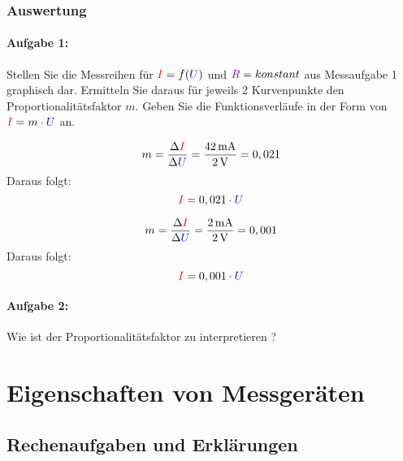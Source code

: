 \documentclass[11pt,a4paper,titlepage]{scrreprt}
\begin{document}
        \subsection{Auswertung}
          \subsubsection{Aufgabe 1:} Stellen Sie die Messreihen für $\textcolor{red}{I} = f(\textcolor{blue}{U})$ und $\textcolor{violet}{R} = konstant$  aus Messaufgabe 1 graphisch dar. Ermitteln Sie daraus für jeweils 2 Kurvenpunkte den Proportionalitätsfaktor $m$. Geben Sie die Funktionsverläufe in der Form von $\textcolor{red}{I} = m \cdot \textcolor{blue}{U}$ an.
            
            \begin{equation*}
            	m = \frac{\Delta \textcolor{red}{I}}{\Delta \textcolor{blue}{U}} = \frac{\SI{42}{\milli\ampere}}{\SI{2}{\volt}} = 0,021
            \end{equation*}
            Daraus folgt:
            \begin{equation*}
            	\textcolor{red}{I} = 0,021 \cdot \textcolor{blue}{U}
            \end{equation*}
            
            
            \begin{equation*}
            	m = \frac{\Delta \textcolor{red}{I}}{\Delta \textcolor{blue}{U}} = \frac{\SI{2}{\milli\ampere}}{\SI{2}{\volt}} = 0,001
            \end{equation*}
            Daraus folgt:
            \begin{equation*}
            	\textcolor{red}{I} = 0,001 \cdot \textcolor{blue}{U}
            \end{equation*}
          
          \subsubsection{Aufgabe 2:} Wie ist der Proportionalitätsfaktor zu interpretieren ? 
          
    \chapter{Eigenschaften von Messgeräten}


        \section{Rechenaufgaben und Erklärungen}
           
\end{document}
